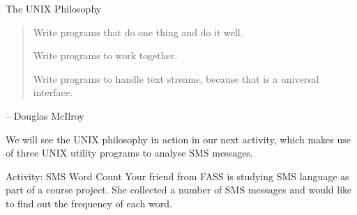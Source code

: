 \documentclass[a4paper]{beamer}
\begin{document}


\begin{frame}{The UNIX Philosophy}
\begin{quote}
Write programs that do one thing and do it well.

Write programs to work together.

Write programs to handle text streams, because that is a universal interface.
\end{quote}
\begin{flushright}
-- Douglas McIlroy
\end{flushright}
\end{frame}


We will see the UNIX philosophy in action in our next activity, which makes use
of three UNIX utility programs to analyse SMS messages.  

\begin{frame}{Activity: SMS Word Count}
Your friend from FASS is studying SMS language as part of a course project. She
collected a number of SMS messages and would like to find out the frequency of
each word. 
\end{frame}
\end{document}
